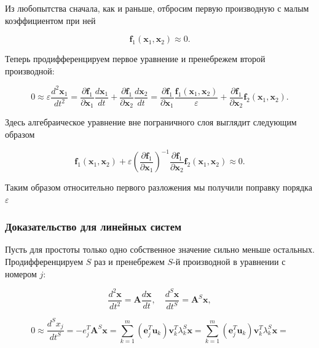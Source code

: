 	Из любопытства сначала, как и раньше, отбросим первую производную с малым коэффициентом при ней
	
	\begin{equation}
		\mathbf{f}_1(\mathbf{x}_1, \mathbf{x}_2) \approx 0.
	\end{equation}
	
	Теперь продифференцируем первое уравнение и пренебрежем второй производной:
	
	\begin{equation}
		0 \approx \varepsilon \frac{d^2 \mathbf{x}_1}{dt^2} = \frac{\partial \mathbf{f}_1}{\partial \mathbf{x}_1} \frac{d\mathbf{x}_1}{dt} + \frac{\partial \mathbf{f}_1}{\partial \mathbf{x}_2} \frac{d\mathbf{x}_2}{dt} = \frac{\partial \mathbf{f}_1}{\partial \mathbf{x}_1} \frac{\mathbf{f}_1(\mathbf{x}_1, \mathbf{x}_2)}{\varepsilon} + \frac{\partial \mathbf{f}_1}{\partial \mathbf{x}_2} \mathbf{f}_2(\mathbf{x}_1, \mathbf{x}_2).
	\end{equation}
	
	Здесь алгебраическое уравнение вне пограничного слоя выглядит следующим образом
	
	\begin{equation}
		\mathbf{f}_1(\mathbf{x}_1, \mathbf{x}_2) + \varepsilon \left( \frac{\partial \mathbf{f}_1}{\partial \mathbf{x}_1} \right)^{-1} \frac{\partial \mathbf{f}_1}{\partial \mathbf{x}_2} \mathbf{f}_2(\mathbf{x}_1, \mathbf{x}_2) \approx 0.
	\end{equation}
	
	Таким образом относительно первого разложения мы получили поправку порядка $\varepsilon$
	
	\newpage
	
	\subsubsection{Доказательство для линейных систем}
	
	Пусть для простоты только одно собственное значение сильно меньше остальных. Продифференцируем $S$ раз и пренебрежем $S$-й производной в уравнении с номером $j$:
	
	\[
	\frac{d^2 \mathbf{x}}{dt^2} = \mathbf{A} \frac{d\mathbf{x}}{dt}, \quad \frac{d^S \mathbf{x}}{dt^S} = \mathbf{A}^S \mathbf{x},
	\]
	
	\begin{equation}
		0 \approx \frac{d^S x_j}{dt^S} = -e_j^T \mathbf{A}^S \mathbf{x} = \sum_{k=1}^{m} \left( \mathbf{e}_j^T \mathbf{u}_k \right) \mathbf{v}_k^T \lambda_k^S \mathbf{x} = \sum_{k=1}^{m} \left( \mathbf{e}_j^T \mathbf{u}_k \right) \mathbf{v}_k^T \lambda_k^S \mathbf{x} =
	\end{equation}
	
